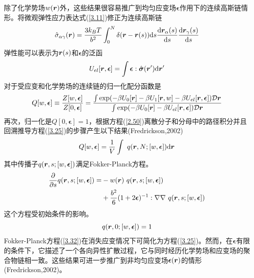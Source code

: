 除了化学势场$w(\bm{r})$外，这些结果很容易推广到均匀应变场$\boldsymbol{\epsilon}$作用下的连续高斯链情形。将微观弹性应力表达式(\ref{3.11})修正为连续高斯链
\begin{equation}\label{3.28}
\hat{\sigma}_{\alpha\gamma}(\bm{r})=\frac{3k_BT}{b^2}\int_0^N\delta(\bm{r}-\bm{r}(s))\mathrm{d}s\frac{\mathrm{d}\bm{r}_{\alpha}(s)}{\mathrm{d}s}\frac{\mathrm{d}\bm{r}_{\gamma}(s)}{\mathrm{d}s}
\end{equation}
弹性能可以表示为$\bm{r}(s)$和$\boldsymbol{\epsilon}$的泛函
\begin{equation}\label{3.29}
U_{el}[\bm{r},\boldsymbol{\epsilon}]=\int\boldsymbol{\epsilon}:\hat{\boldsymbol{\sigma}}(\bm{r}')\mathrm{d}\bm{r}'
\end{equation}
对于受应变和化学势场的连续链的归一化配分函数是
\begin{equation}\label{3.30}
Q[w,\boldsymbol{\epsilon}]\equiv\frac{Z[w,\boldsymbol{\epsilon}]}{Z[0,\boldsymbol{\epsilon}]}=\frac{\int\exp(-\beta U_0[\bm{r}]-\beta U_1[\bm{r},w]-\beta U_{el}[\bm{r},\boldsymbol{\epsilon}])\mathcal{D}\bm{r}}{\int\exp(-\beta U_0[\bm{r}]-\beta U_{el}[\bm{r},\boldsymbol{\epsilon}])\mathcal{D}\bm{r}}
\end{equation}
再次，归一化是$Q[0,\boldsymbol{\epsilon}]=1$，根据方程(\ref{2.50})离散分子和分母中的路径积分并且回溯推导方程(\ref{3.25})的步骤产生以下结果(Fredrickson,2002)
\begin{equation}\label{3.31}
Q[w,\boldsymbol{\epsilon}]=\frac{1}{V}\int~q(\bm{r},N;[w,\boldsymbol{\epsilon}])\mathrm{d}\bm{r}
\end{equation}
其中传播子$q(\bm{r},s;[w,\boldsymbol{\epsilon}])$满足Fokker-Planck方程。
\begin{equation}\label{3.32}
\begin{aligned}
\frac{\partial}{\partial s}q(\bm{r},s;[w,\boldsymbol{\epsilon}])=&-w(\bm{r})~q(\bm{r},s;[w,\boldsymbol{\epsilon}])\\
&+\frac{b^2}{6}(1+2\boldsymbol{\epsilon})^{-1}:\nabla\nabla~q(\bm{r},s;[w,\boldsymbol{\epsilon}])
\end{aligned}
\end{equation}
这个方程受初始条件的影响。
\begin{equation}\label{3.33}
q(\bm{r},0;[w,\boldsymbol{\epsilon}])=1
\end{equation}
Fokker-Planck方程(\ref{3.32})在消失应变情况下可简化为方程(\ref{3.25})。然而，在$\boldsymbol{\epsilon}$有限的条件下，它描述了一个各向异性扩散过程，它与同时经历化学势场和应变场的聚合物链相一致。这些结果可进一步推广到非均匀应变场$\boldsymbol{\epsilon}(\bm{r})$的情形(Fredrickson,2002)。
